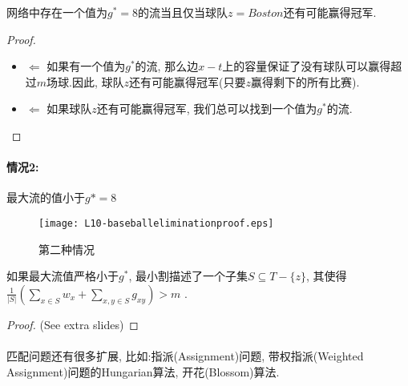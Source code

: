         \begin{theorem}
网络中存在一个值为$g^*=8$的流当且仅当球队$z=Boston$还有可能赢得冠军.
        \end{theorem}
        \begin{proof}
\begin{itemize} 
 \item $\Leftarrow$
如果有一个值为$g^*$的流, 那么边$x-t$上的容量保证了没有球队可以赢得超过$m$场球.因此, 球队$z$还有可能赢得冠军(只要$z$赢得剩下的所有比赛).
  \item $\Leftarrow$
如果球队$z$还有可能赢得冠军, 我们总可以找到一个值为$g^*$的流.
\end{itemize}
\end{proof}
        \paragraph{情况2:}最大流的值小于$g*=8$
        \begin{figure}[h]
            \centering
            \texttt{[image: L10-baseballeliminationproof.eps]}
            \caption{第二种情况}
            \label{Figure: matching_baseball_elimination_proof}
        \end{figure}
        \begin{theorem}
如果最大流值严格小于$g^*$, 最小割描述了一个子集$S \subseteq T-\{z\}$, 其使得$\frac{1}{|S|} ( \sum\nolimits_{x\in S} w_x + \sum\nolimits_{x,y\in S} g_{xy} ) > m$ \nonumber.
        \end{theorem}
        \begin{proof}
 (See extra slides)
        \end{proof}
        \paragraph{} 匹配问题还有很多扩展, 比如:指派({\sc Assignment})问题, 带权指派({\sc Weighted Assignment})问题的Hungarian算法, 开花(Blossom)算法.
        
 
 
 
%